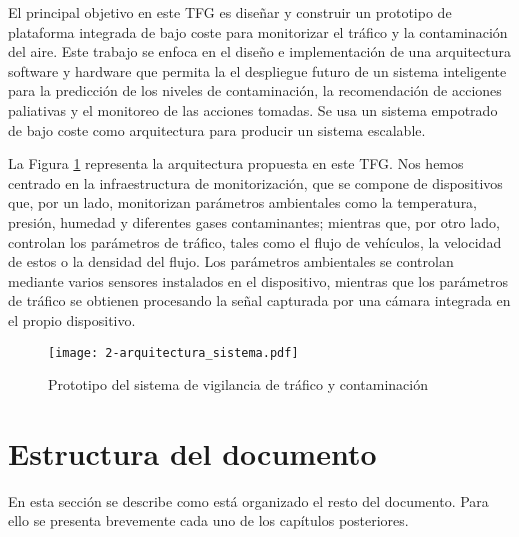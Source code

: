 El principal objetivo en este \ac{TFG} es diseñar y construir un prototipo de plataforma integrada de bajo coste para monitorizar el tráfico y la contaminación del aire. Este trabajo se enfoca en el diseño e implementación de una arquitectura software y hardware que permita la el despliegue futuro de un sistema inteligente para la predicción de los niveles de contaminación, la recomendación de acciones paliativas y el monitoreo de las acciones tomadas. Se usa un sistema empotrado de bajo coste como arquitectura para producir un sistema escalable.

La Figura \ref{fig:2-arquitectura_sistema} representa la arquitectura propuesta en este \ac{TFG}. Nos hemos centrado en la infraestructura de monitorización, que se compone de dispositivos que, por un lado, monitorizan parámetros ambientales como la temperatura, presión, humedad y diferentes gases contaminantes; mientras que, por otro lado, controlan los parámetros de tráfico, tales como el flujo de vehículos, la velocidad de estos o la densidad del flujo. Los parámetros ambientales se controlan mediante varios sensores instalados en el dispositivo, mientras que los parámetros de tráfico se obtienen procesando la señal capturada por una cámara integrada en el propio dispositivo.

\begin{figure}[!h]
	\begin{center}
		\texttt{[image: 2-arquitectura\_sistema.pdf]}	
		\caption{Prototipo del sistema de vigilancia de tráfico y contaminación}
		\label{fig:2-arquitectura_sistema}
	\end{center}
\end{figure}


\section{Estructura del documento} 
En esta sección se describe como está organizado el resto del documento. Para ello se presenta brevemente cada uno de los capítulos posteriores.

